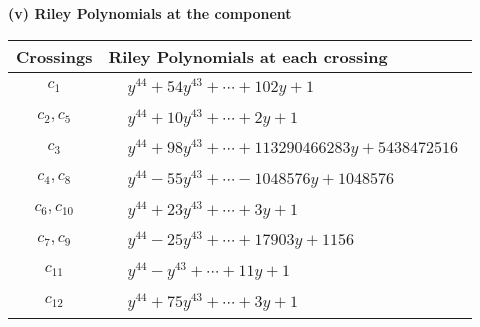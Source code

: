 \documentclass[1p]{elsarticle_modified}
\theoremstyle{definition}
\begin{document}
\newpage\renewcommand{\arraystretch}{1}
\flushleft \textbf{(v) Riley Polynomials at the component}\newline \\
\begin{tabular}{m{50pt}|m{274pt}}
Crossings & \hspace{64pt}Riley Polynomials at each crossing \\
\hline $$\begin{aligned}c_{1}\end{aligned}$$&$\begin{aligned}
&y^{44}+54 y^{43}+\cdots+102 y+1
\end{aligned}$\\
\hline $$\begin{aligned}c_{2},c_{5}\end{aligned}$$&$\begin{aligned}
&y^{44}+10 y^{43}+\cdots+2 y+1
\end{aligned}$\\
\hline $$\begin{aligned}c_{3}\end{aligned}$$&$\begin{aligned}
&y^{44}+98 y^{43}+\cdots+113290466283 y+5438472516
\end{aligned}$\\
\hline $$\begin{aligned}c_{4},c_{8}\end{aligned}$$&$\begin{aligned}
&y^{44}-55 y^{43}+\cdots-1048576 y+1048576
\end{aligned}$\\
\hline $$\begin{aligned}c_{6},c_{10}\end{aligned}$$&$\begin{aligned}
&y^{44}+23 y^{43}+\cdots+3 y+1
\end{aligned}$\\
\hline $$\begin{aligned}c_{7},c_{9}\end{aligned}$$&$\begin{aligned}
&y^{44}-25 y^{43}+\cdots+17903 y+1156
\end{aligned}$\\
\hline $$\begin{aligned}c_{11}\end{aligned}$$&$\begin{aligned}
&y^{44}- y^{43}+\cdots+11 y+1
\end{aligned}$\\
\hline $$\begin{aligned}c_{12}\end{aligned}$$&$\begin{aligned}
&y^{44}+75 y^{43}+\cdots+3 y+1
\end{aligned}$\\
\hline
\end{tabular}\\~\\
\end{document}
